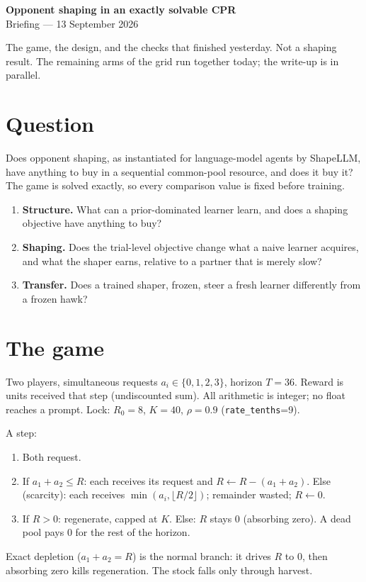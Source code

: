 \documentclass[11pt,a4paper]{article}
\begin{document}
\begin{center}
{\Large\bfseries Opponent shaping in an exactly solvable CPR}\\[3pt]
{\large Briefing --- 13 September 2026}\\[2pt]
\end{center}

The game, the design, and the checks that finished yesterday.
Not a shaping result. The remaining arms of the grid run together today; the write-up is in parallel.

\section*{Question}
Does opponent shaping, as instantiated for language-model agents by ShapeLLM, have anything to buy in a sequential common-pool resource, and does it buy it?
The game is solved exactly, so every comparison value is fixed before training.

\begin{enumerate}
\item \textbf{Structure.} What can a prior-dominated learner learn, and does a shaping objective have anything to buy?
\item \textbf{Shaping.} Does the trial-level objective change what a naive learner acquires, and what the shaper earns, relative to a partner that is merely slow?
\item \textbf{Transfer.} Does a trained shaper, frozen, steer a fresh learner differently from a frozen hawk?
\end{enumerate}

\section*{The game}
Two players, simultaneous requests \(a_i\in\{0,1,2,3\}\), horizon \(T=36\).
Reward is units received that step (undiscounted sum).
All arithmetic is integer; no float reaches a prompt.
Lock: \(R_0=8\), \(K=40\), \(\rho=0.9\) (\texttt{rate\_tenths}=9).

A step:
\begin{enumerate}
\item Both request.
\item If \(a_1+a_2\le R\): each receives its request and \(R\leftarrow R-(a_1+a_2)\).
  Else (scarcity): each receives \(\min(a_i,\lfloor R/2\rfloor)\); remainder wasted; \(R\leftarrow 0\).
\item If \(R>0\): regenerate, capped at \(K\).
  Else: \(R\) stays 0 (absorbing zero). A dead pool pays 0 for the rest of the horizon.
\end{enumerate}
Exact depletion (\(a_1+a_2=R\)) is the normal branch: it drives \(R\) to 0, then absorbing zero kills regeneration.
The stock falls only through harvest.
\end{document}
